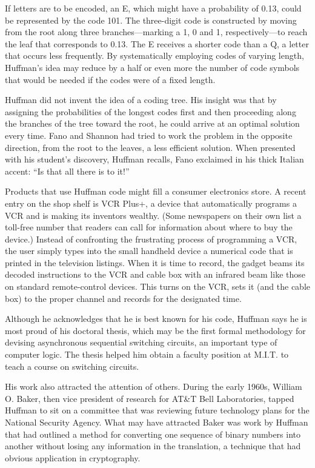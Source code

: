 If letters are to be encoded, an E, which might have a probability of 0.13, 
could be represented by the code 101. The three-digit code is constructed 
by moving from the root along three branches---marking a 1, 0 and 1, respectively---to 
reach the leaf that corresponds to 0.13. The E receives a shorter code than 
a Q, a letter that occurs less frequently. By systematically employing codes 
of varying length, Huffman's idea may reduce by a half or even more the number 
of code symbols that would be needed if the codes were of a fixed length.

Huffman did not invent the idea of a coding tree. His insight was that by 
assigning the probabilities of the longest codes first and then proceeding 
along the branches of the tree toward the root, he could arrive at an optimal 
solution every time. Fano and Shannon had tried to work the problem in the 
opposite direction, from the root to the leaves, a less efficient solution. 
When presented with his student's discovery, Huffman recalls, Fano exclaimed 
in his thick Italian accent: ``Is that all there is to it!''

Products that use Huffman code might fill a consumer electronics store. A 
recent entry on the shop shelf is VCR Plus+, a device that automatically 
programs a VCR and is making its inventors wealthy. (Some newspapers on their 
own list a toll-free number that readers can call for information about where 
to buy the device.) Instead of confronting the frustrating process of programming 
a VCR, the user simply types into the small handheld device a numerical code 
that is printed in the television listings. When it is time to record, the 
gadget beams its decoded instructions to the VCR and cable box with an infrared 
beam like those on standard remote-control devices. This turns on the VCR, 
sets it (and the cable box) to the proper channel and records for the designated time.

Although he acknowledges that he is best known for his code, Huffman says 
he is most proud of his doctoral thesis, which may be the first formal methodology 
for devising asynchronous sequential switching circuits, an important type 
of computer logic. The thesis helped him obtain a faculty position at M.I.T. 
to teach a course on switching circuits.

His work also attracted the attention of others. During the early 1960s, 
William O. Baker, then vice president of research for AT\&T Bell Laboratories, 
tapped Huffman to sit on a committee that was reviewing future technology 
plans for the National Security Agency. What may have attracted Baker was 
work by Huffman that had outlined a method for converting one sequence of 
binary numbers into another without losing any information in the translation, 
a technique that had obvious application in cryptography.

